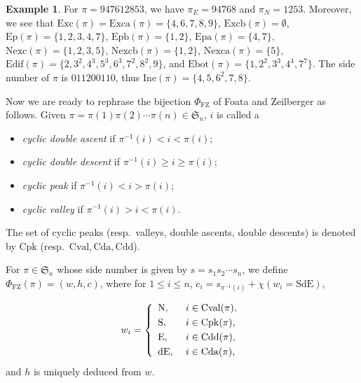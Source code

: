 \documentclass[12pt]{amsart}
\numberwithin{equation}{section}
\theoremstyle{plain}
\theoremstyle{definition}
\newtheorem{example}[theorem]{Example}
\def\FZ{\mathrm{FZ}}
\def\SS{\mathfrak{S}}
\def\N{\mathrm{N}}
\def\S{\mathrm{S}}
\def\E{\mathrm{E}}
\def\dE{\mathrm{dE}}
\def\SdE{\mathrm{SdE}}
\def\Edif{\mathrm{Edif}}
\def\Excp{\mathrm{Ep}}
\def\Exc{\mathrm{Exc}}
\def\Nexc{\mathrm{Nexc}}
\def\Excpb{\mathrm{Epb}}
\def\Excpa{\mathrm{Epa}}
\def\Nexcb{\mathrm{Nexcb}}
\def\Nexca{\mathrm{Nexca}}
\def\Excb{\mathrm{Excb}}
\def\Exca{\mathrm{Exca}}
\def\Ine{\mathrm{Ine}}
\def\Ebot{\mathrm{Ebot}}
\def\Cpk{\mathrm{Cpk}}
\def\Cval{\mathrm{Cval}}
\def\Cda{\mathrm{Cda}}
\def\Cdd{\mathrm{Cdd}}
\begin{document}
\begin{example}
For $\pi=947612853$, we have $\pi_E=9 4 7 6 8$ and $\pi_N=1 2 5 3$. Moreover, we see that $\Exc(\pi)=\Exca(\pi)=\{4,6,7,8,9\}$, $\Excb(\pi)=\emptyset$,
$\Excp(\pi)=\{1,2,3,4,7\}$, $\Excpb(\pi)=\{1,2\}$,
$\Excpa(\pi)=\{4,7\}$,
$\Nexc(\pi)=\{1,2,3,5\}$,
$\Nexcb(\pi)=\{1,2\}$,
$\Nexca(\pi)=\{5\}$,
$\Edif(\pi)=\{2,3^2,4^3,5^3,6^3,7^2,8^2,9\}$, and
$\Ebot(\pi)=\{1,2^2,3^3,4^4,7^7\}$. The side number of $\pi$ is $011200110$, thus $\Ine(\pi)=\{4,5,6^2,7,8\}$.
\end{example}

Now we are ready to rephrase the bijection $\Phi_{\FZ}$ of
Foata and Zeilberger as follows. Given $\pi=\pi(1) \pi(2) \cdots \pi(n) \in \SS_n$,  $i$ is called a
\begin{itemize}
  \item {\em cyclic double ascent} if $\pi^{-1}(i) < i <\pi(i)$;
  \item {\em cyclic double descent} if $\pi^{-1}(i) \geq  i \geq \pi(i)$;
  \item {\em cyclic peak} if $\pi^{-1}(i) < i >\pi(i)$;
  \item {\em cyclic valley} if $\pi^{-1}(i) > i <\pi(i)$.
\end{itemize}
The set of cyclic peaks (resp.~valleys, double ascents, double descents) is denoted by $\Cpk$ (resp.~$\Cval, \Cda, \Cdd$).



For $\pi \in \SS_n$ whose side number is given by $s=s_1 s_2 \cdots s_n$, we define $\Phi_{\FZ}(\pi)=(w,h,c)$, where for $1\le i\le n$, $c_{i}=s_{\pi^{-1}(i)}+\chi(w_{i}=\SdE)$,

\begin{equation*}
w_i= \left\{
  \begin{array}{ll}
\N, & \mbox{ $ i \in \Cval(\pi)$,}\\[3pt]
\S, & \mbox{  $ i \in \Cpk(\pi)$,} \\[3pt]
\E, & \mbox{  $ i \in \Cdd(\pi)$,}\\[3pt]
\dE, & \mbox{  $ i \in \Cda(\pi)$,}
 \end{array} \right.
\end{equation*}
and $h$ is uniquely deduced from $w$.
\end{document}
